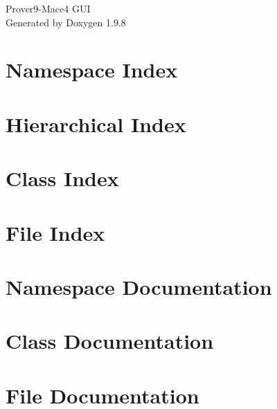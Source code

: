 \documentclass[twoside]{book}
\newcommand{\+}{\discretionary{\mbox{\scriptsize$\hookleftarrow$}}{}{}}
\newcommand{\clearemptydoublepage}{%
    \newpage{\pagestyle{empty}\cleardoublepage}%
  }
\begin{document}
  \raggedbottom
    \hypersetup{pageanchor=false,
                bookmarksnumbered=true,
                pdfencoding=unicode
               }
  \begin{titlepage}
  \vspace*{7cm}
  \begin{center}%
  {\Large Prover9-\/\+Mace4 GUI}\\
  \vspace*{1cm}
  {\large Generated by Doxygen 1.9.8}\\
  \end{center}
  \end{titlepage}
  \clearemptydoublepage
  \tableofcontents
  \clearemptydoublepage
  \hypersetup{pageanchor=true}


\chapter{Namespace Index}

\chapter{Hierarchical Index}

\chapter{Class Index}

\chapter{File Index}

\chapter{Namespace Documentation}



\chapter{Class Documentation}



\chapter{File Documentation}




  \backmatter
  \newpage
  \clearemptydoublepage
  \printindex
\end{document}
